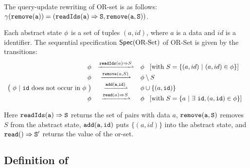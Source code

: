 \begin{example}
\label{definition:sequential specification of or-set}
The query-update rewriting of OR-set is as follows: $\gamma( \alabelshort[{\tt remove}]{a} ) = ( \alabellong[{\tt readIds}]{a}{S}{}, \alabelshort[{\tt remove}]{a,S})$.


Each abstract state $\phi$ is a set of tuples $(a,id)$, where $a$
is a data and $id$ is a identifier. The sequential specification
$\mathsf{Spec}(\text{OR\text{-}Set})$ of OR-Set is given by the transitions:
\[
  \begin{array}{rcl}
    \abstate
    & \xrightharpoonup{\alabellong[\mathtt{readIds}]{a}{S}{}}
    & \abstate\
      \begin{array}{c}
        [\text{with}\ S = \{ (a,id)\ \vert\ (a,id) \in \abstate\}]
      \end{array}\\
    \abstate &
               \xrightharpoonup{\alabelshort[\mathtt{remove}]{a,S}}
    & \abstate \setminus S \\
    \big(\ \abstate\ |\ \mathtt{id}\ \text{does not occur in } \abstate\ \big)
             & \xrightharpoonup{ \alabelshort[{\tt add}]{a,id} }
    & \abstate \cup \{ (a,\mathtt{id}) \}\\
    \abstate
    & \xrightharpoonup{\alabellong[\mathtt{read}]{a}{ S }{}}
    & \abstate\
      \begin{array}{c}
        [\text{with}\ S = \{ a\ \vert\ \exists\ \mathtt{id}, (a,\mathtt{id}) \in \abstate \}]
      \end{array}
  \end{array}
\]

Here $\alabellong[{\tt readIds}]{a}{S}{}$ returns the set of pairs with data $a$, $\alabelshort[{\tt remove}]{a,S}$ removes $S$ from the abstract state, $\alabelshort[{\tt add}]{a,id}$ puts $\{ (a,id) \}$ into the abstract state, and $\alabellong[{\tt read}]{}{S'}{}$ returns the value of the or-set.
\end{example}


\subsection{Definition of \CRDTLin{}}
\label{subsec:definition of distributed linearizability}

